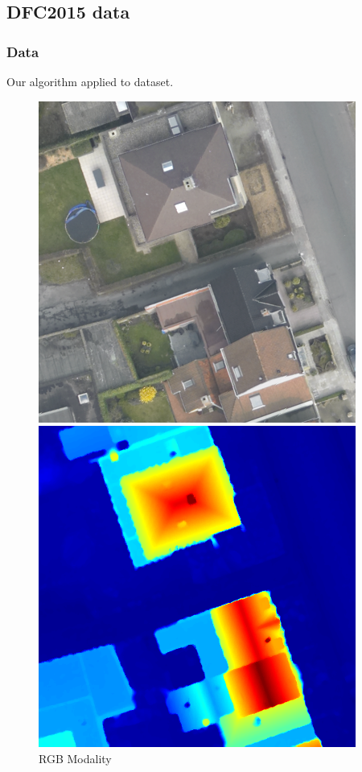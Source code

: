 \documentclass{beamer}
\begin{document}
\subsection{DFC2015 data}
\begin{frame}
  \frametitle{Data}
  Our algorithm applied to \cite{DFC2015} dataset.
  \begin{figure}[ht]
    \begin{minipage}[b]{0.45\linewidth}
      \centering
      \includegraphics[width=\textwidth]{./Images/DFC2015/optical.png}
      \caption{RGB Modality}
    \end{minipage}
    \begin{minipage}[b]{0.45\linewidth}
      \centering
      \includegraphics[width=\textwidth]{./Images/DFC2015/lidarColor.png}

\end{minipage}
\end{figure}
\end{frame}
\end{document}
